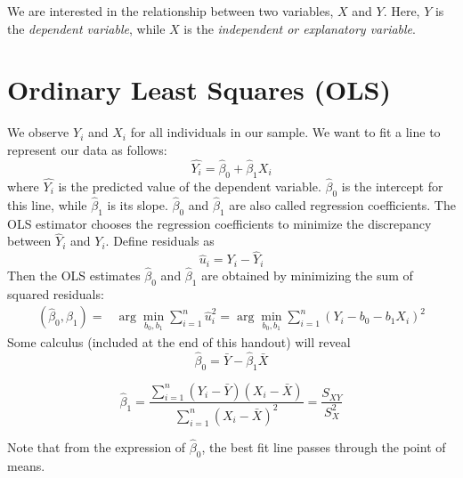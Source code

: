 \documentclass{./../../Latex/handout}
\begin{document}
\thispagestyle{plain}

We are interested in the relationship between two variables, $X$ and $Y$. Here, $Y$ is the \textit{dependent variable}, while $X$ is the \textit{independent or explanatory variable}. 

\section{Ordinary Least Squares (OLS)}
We observe $Y_i$ and $X_i$ for all individuals in our sample. We want to fit a line to represent our data as follows: 
$$ \hat{Y_i} = \hat{\beta}_0 + \hat{\beta}_1 X_i $$
where $\hat{Y_i}$ is the predicted value of the dependent variable. $\hat{\beta}_0$ is the intercept for this line, while $\hat{\beta}_1$ is its slope. $\hat{\beta}_0$ and $\hat{\beta}_1$ are also called regression coefficients. The OLS estimator chooses the regression coefficients to minimize the discrepancy between $\hat{Y}_i$ and $Y_i$. Define residuals as
$$ \hat{u}_i = Y_i-\hat{Y}_i $$  
Then the OLS estimates $\hat{\beta}_0$ and $\hat{\beta}_1$ are obtained by minimizing the sum of squared residuals: 
\begin{align*}
(\hat{\beta}_0,\hat{\beta}_1)= & \arg \min_{b_0, b_1} \sum_{i=1}^n \hat{u}_i^2 = \arg \min_{b_0, b_1} \sum_{i=1}^n(Y_i - {b_0} - {b_1} X_i)^2
\end{align*}
Some calculus (included at the end of this handout) will reveal 
 $$ \hat{\beta}_0 = \bar{Y}-\hat{\beta}_1 \bar{X} $$

 $$ \hat{\beta}_1 = \frac{ \sum_{i=1}^n(Y_i - \bar{Y})(X_i-\bar{X})}{ \sum_{i=1}^n(X_i - \bar{X})^2 } = \frac{S_{XY}}{S^2_X}$$

Note that from the expression of $\hat{\beta}_0$, the best fit line passes through the point of means. 

\end{document}
